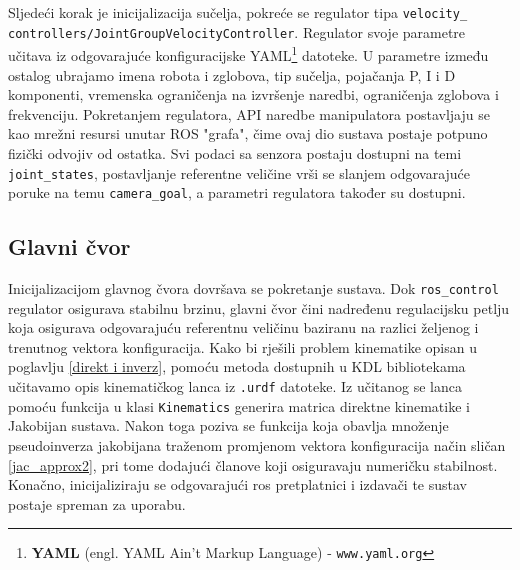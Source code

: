 \documentclass[times, utf8, diplomski, numeric]{fer}
\begin{document}
Sljedeći korak je inicijalizacija sučelja, pokreće se regulator tipa \texttt{velocity\_ controllers/JointGroupVelocityController}. 
Regulator svoje parametre učitava iz odgovarajuće konfiguracijske YAML\footnote{\textbf{YAML} (engl. YAML Ain't Markup Language) - \texttt{www.yaml.org}} datoteke.
U parametre između ostalog ubrajamo imena robota i zglobova, tip sučelja, pojačanja P, I i D komponenti, vremenska ograničenja na izvršenje naredbi, ograničenja zglobova i frekvenciju.
Pokretanjem regulatora, API naredbe manipulatora postavljaju se kao mrežni resursi unutar ROS "grafa", čime ovaj dio sustava postaje potpuno fizički odvojiv od ostatka.
Svi podaci sa senzora postaju dostupni na temi \texttt{joint\_states}, postavljanje referentne veličine vrši se slanjem odgovarajuće poruke na temu \texttt{camera\_goal}, a parametri regulatora također su dostupni.

\subsection{Glavni čvor}
Inicijalizacijom glavnog čvora dovršava se pokretanje sustava.
Dok \texttt{ros\_control} regulator osigurava stabilnu brzinu, glavni čvor čini nadređenu regulacijsku petlju koja osigurava odgovarajuću referentnu veličinu baziranu na razlici željenog i trenutnog vektora konfiguracija.
Kako bi rješili problem kinematike opisan u poglavlju \ref{direkt i inverz}, pomoću metoda dostupnih u KDL bibliotekama učitavamo opis kinematičkog lanca iz \texttt{.urdf} datoteke.
Iz učitanog se lanca pomoću funkcija u klasi \texttt{Kinematics} generira matrica direktne kinematike i Jakobijan sustava. 
Nakon toga poziva se funkcija koja obavlja množenje pseudoinverza jakobijana traženom promjenom vektora konfiguracija način sličan \ref{jac_approx2}, pri tome dodajući članove koji osiguravaju numeričku stabilnost.
Konačno, inicijaliziraju se odgovarajući ros pretplatnici i izdavači te sustav postaje spreman za uporabu.
\end{document}
